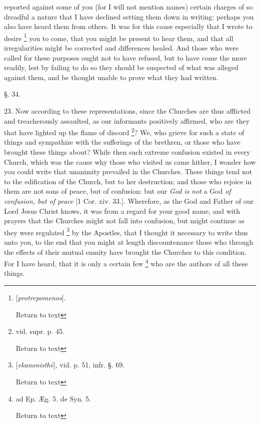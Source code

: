 reported against some of you (for I will not mention names) certain
charges of so dreadful a nature that I have declined setting them down
in writing: perhaps you also have heard them from others. It was for
this cause especially that I wrote to desire \footnote{[\emph{protrepomenos}].

Return to text} you to come, that you might be present to hear them, and that
all irregularities might be corrected and differences healed. And
those who were called for these purposes ought not to have refused,
but to have come the more readily, lest by failing to do so they
should be suspected of what was alleged against them, and be thought
unable to prove what they had written.

§. 34.

23. Now according to these representations, since
the Churches are thus afflicted and treacherously assaulted, as our
informants positively affirmed, who are they that have lighted up the
flame of discord \footnote{vid. supr. p. 45.

Return to text}?
We, who grieve for such a state of things and sympathize with the
sufferings of the brethren, or those who have brought these things
about? While then such extreme confusion existed in every Church,
which was the cause why those who visited us came hither, I wonder how
you could write that unanimity prevailed in the Churches. These things
tend not to the edification of the Church, but to her destruction; and
those who rejoice in them are not sons of peace, but of confusion: but
our \emph{God is not} a God \emph{of confusion, but of peace} [1 Cor.
xiv. 33.]. Wherefore, as the God and Father of our Lord Jesus Christ
knows, it was from a regard for your good name, and with prayers
that the Churches might not fall into confusion, but might continue as
they were regulated \footnote{[\emph{ekanonisth\={e}}], vid. p. 51, infr. §. 69.

Return to text}
by the Apostles, that I thought it necessary to write thus unto you,
to the end that you might at length discountenance those who through
the effects of their mutual enmity have brought the Churches to this
condition. For I have heard, that it is only a certain few \footnote{ad Ep. Æg. 5. de Syn. 5.

Return to text} who are the authors of all these things.

